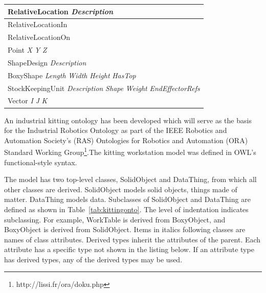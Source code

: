 \documentclass[final,1p,times]{elsarticle}
\newcommand{\class}[1] {\textsf{#1}}
\begin{document}
\begin{table}[!h!t]
{\begin{tabular}{l}
\\\midrule
\hspace{10 mm}\class{RelativeLocation} \textit{Description}
\\\midrule
\hspace{15 mm}\class{RelativeLocationIn}
\\\midrule
\hspace{15 mm}\class{RelativeLocationOn}
\\\midrule
\hspace{5 mm}\class{Point} \textit{X} \textit{Y} \textit{Z}
\\\midrule
\hspace{5 mm}\class{ShapeDesign} \textit{Description}
\\\midrule
\hspace{10 mm}\class{BoxyShape} \textit{Length} \textit{Width} \textit{Height} \textit{HasTop}
\\\midrule
\hspace{5 mm}\class{StockKeepingUnit} \textit{Description} \textit{Shape} \textit{Weight} \textit{EndEffectorRefs}
\\\midrule
\hspace{5 mm}\class{Vector} \textit{I} \textit{J} \textit{K}
\\\bottomrule
\end{tabular}
}
\end{table}

An industrial kitting ontology has been developed which will serve as the basis for the Industrial Robotics Ontology as part of the IEEE Robotics and Automation Society's (RAS) Ontologies for Robotics and Automation (ORA) Standard Working Group\footnote{http://lissi.fr/ora/doku.php}.The kitting workstation model was defined in OWL's functional-style syntax.

The model has two top-level classes, \textsf{SolidObject} and \class{DataThing}, from which all other classes are derived. \class{SolidObject} models solid objects, things made of matter. \class{DataThing} models data. Subclasses of \class{SolidObject} and \class{DataThing} are defined as shown in Table~\ref{tab:kittingonto}. The level of indentation indicates subclassing. For example, \class{WorkTable} is derived from \class{BoxyObject}, and \class{BoxyObject} is derived from \class{SolidObject}. Items in italics following classes are names of class attributes. Derived types inherit the attributes of the parent. Each attribute has a specific type not shown in the listing below. If an attribute type has derived types, any of the derived types may be used.
\end{document}
